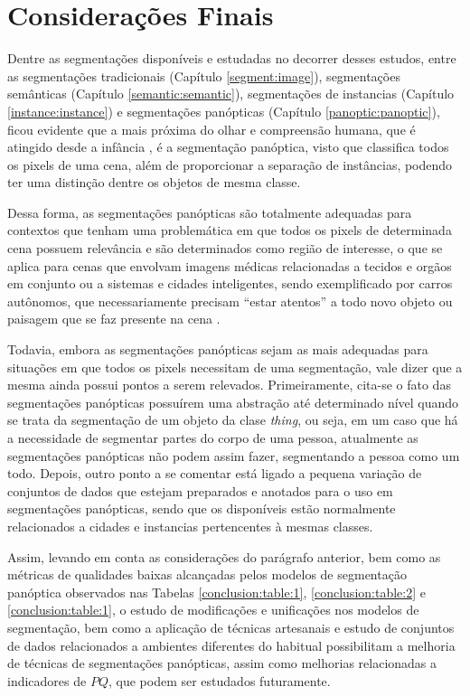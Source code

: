 \newpage
\clearpage
\section{Considerações Finais}
\label{final:final}

Dentre as segmentações disponíveis e estudadas no decorrer desses estudos, entre as segmentações tradicionais (Capítulo \ref{segment:image}), segmentações semânticas (Capítulo \ref{semantic:semantic}), segmentações de instancias (Capítulo \ref{instance:instance}) e segmentações panópticas (Capítulo \ref{panoptic:panoptic}), ficou evidente que a mais próxima do olhar e compreensão humana, que é atingido desde a infância \cite{Mohan2020}, é a segmentação panóptica, visto que classifica todos os pixels de uma cena, além de proporcionar a separação de instâncias, podendo ter uma distinção dentre os objetos de mesma classe.

Dessa forma, as segmentações panópticas são totalmente adequadas para contextos que tenham uma problemática em que todos os pixels de determinada cena possuem relevância e são determinados como região de interesse, o que se aplica para cenas que envolvam imagens médicas relacionadas a tecidos e orgãos em conjunto ou a sistemas e cidades inteligentes, sendo exemplificado por carros autônomos, que necessariamente precisam ``estar atentos'' a todo novo objeto ou paisagem que se faz presente na cena \cite{Pan2020}.

Todavia, embora as segmentações panópticas sejam as mais adequadas para situações em que todos os pixels necessitam de uma segmentação, vale dizer que a mesma ainda possui pontos a serem relevados. Primeiramente, cita-se o fato das segmentações panópticas possuírem uma abstração até determinado nível quando se trata da segmentação de um objeto da clase \textit{thing}, ou seja, em um caso que há a necessidade de segmentar partes do corpo de uma pessoa, atualmente as segmentações panópticas não podem assim fazer, segmentando a pessoa como um todo. Depois, outro ponto a se comentar está ligado a pequena variação de conjuntos de dados que estejam preparados e anotados para o uso em segmentações panópticas, sendo que os disponíveis estão normalmente relacionados a cidades e instancias pertencentes à mesmas classes.

Assim, levando em conta as considerações do parágrafo anterior, bem como as métricas de qualidades baixas alcançadas pelos modelos de segmentação panóptica observados nas Tabelas \ref{conclusion:table:1}, \ref{conclusion:table:2} e \ref{conclusion:table:1}, o estudo de modificações e unificações nos modelos de segmentação, bem como a aplicação de técnicas artesanais e estudo de conjuntos de dados relacionados a ambientes diferentes do habitual possibilitam a melhoria de técnicas de segmentações panópticas, assim como melhorias relacionadas a indicadores de $PQ$, que podem ser estudados futuramente.

